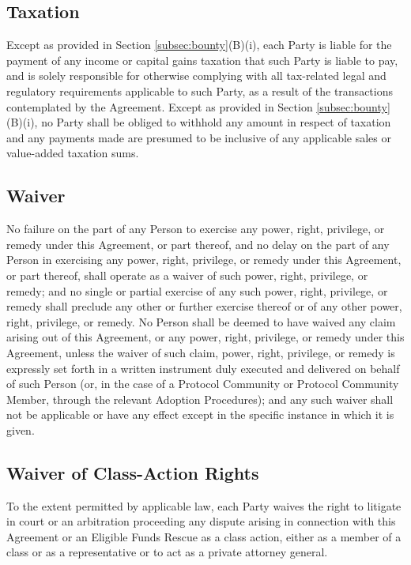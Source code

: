 \documentclass{article}
\begin{document}
\subsection{Taxation}\label{subsec:taxation}

Except as provided in Section \ref{subsec:bounty}(B)(i), each Party is liable for the payment of any income or capital gains taxation that such Party is liable to pay, and is solely responsible for otherwise complying with all tax-related legal and regulatory requirements applicable to such Party, as a result of the transactions contemplated by the Agreement. Except as provided in Section \ref{subsec:bounty}(B)(i), no Party shall be obliged to withhold any amount in respect of taxation and any payments made are presumed to be inclusive of any applicable sales or value-added taxation sums.

\subsection{Waiver}\label{subsec:waiver}

No failure on the part of any Person to exercise any power, right, privilege, or remedy under this Agreement, or part thereof, and no delay on the part of any Person in exercising any power, right, privilege, or remedy under this Agreement, or part thereof, shall operate as a waiver of such power, right, privilege, or remedy; and no single or partial exercise of any such power, right, privilege, or remedy shall preclude any other or further exercise thereof or of any other power, right, privilege, or remedy. No Person shall be deemed to have waived any claim arising out of this Agreement, or any power, right, privilege, or remedy under this Agreement, unless the waiver of such claim, power, right, privilege, or remedy is expressly set forth in a written instrument duly executed and delivered on behalf of such Person (or, in the case of a Protocol Community or Protocol Community Member, through the relevant Adoption Procedures); and any such waiver shall not be applicable or have any effect except in the specific instance in which it is given.

\subsection{Waiver of Class-Action Rights}\label{subsec:waiver_class_action}

To the extent permitted by applicable law, each Party waives the right to litigate in court or an arbitration proceeding any dispute arising in connection with this Agreement or an Eligible Funds Rescue as a class action, either as a member of a class or as a representative or to act as a private attorney general.
\end{document}
